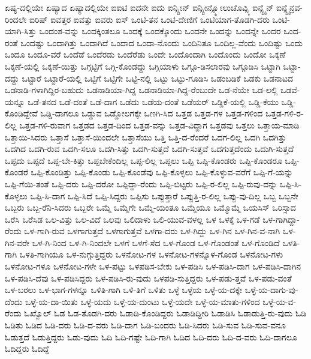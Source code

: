 {ಏಷ್ಯ-ದಲ್ಲಿಯೇ
ಏಷ್ಯಾದ
ಏಷ್ಯಾದಲ್ಲಿಯೇ
ಐಐಟಿ
ಐದನೇ
ಐದು
ಐನ್ಸ್ಟೀನ್
ಐನ್ಸ್ಟೀನ್ಸ್ಮೋಲುಚೊವ್ಸ್ಕಿ
ಐನ್ಸ್ಟೈನ್
ಐನ್ಸ್ಟೈನ್ರವ-ರಿಂದಲೇ
ಐರಿಷ್
ಐವತ್ತರ
ಐವತ್ತು
ಐವರು
ಐಸ್
ಒಂಟಿ-ತನ
ಒಂಟಿ-ದೇಣಿಗೆ
ಒಂಟಿಯಾಗ-ತೊಡಗಿ-ದರು
ಒಂಟಿ-ಯಾಗಿ-ಸಿತ್ತು
ಒಂದಂಶ-ವನ್ನು
ಒಂದಕ್ಕಿಂತಲೂ
ಒಂದಕ್ಕೆ
ಒಂದಕ್ಕೊಂದು
ಒಂದನೇ
ಒಂದನ್ನು
ಒಂದನ್ನೇ
ಒಂದರ
ಒಂದ-ರಂತೆ
ಒಂದಷ್ಟು
ಒಂದಾಗಿತ್ತು
ಒಂದಾಗಿದೆ
ಒಂದಾದ
ಒಂದಾ-ನೊಂದು
ಒಂದಿನಿತೂ
ಒಂದಿಲ್ಲ-ವೆಂದು
ಒಂದಿಷ್ಟು
ಒಂದು
ಒಂದೂ
ಒಂದೂ-ವರೆ
ಒಂದೆಡೆ
ಒಂದೆರಡು
ಒಂದೆರೆಡು
ಒಂದೇ
ಒಂದೊಂದಾಗಿ
ಒಂದೊಂದು
ಒಂದೋ
ಒಕ್ಕಣೆ
ಒಕ್ಕಣೆ-ಯಲ್ಲಿ
ಒಕ್ಕಣೆ-ಯಿತ್ತು
ಒಗ್ಗಟ್ಟಿಗೆ
ಒಗ್ಗಿ-ಕೊಂಡದ್ದು
ಒಗ್ಗಿಯಾಳು
ಒಗ್ಗೂ-ಡಿಸಲಾರವು
ಒಗ್ಗೂಡಿಸಿ
ಒಟ್ಟಾಗಿ
ಒಟ್ಟಾ-ದದ್ದು
ಒಟ್ಟಾರೆ
ಒಟ್ಟಾರೆ-ಯಲ್ಲಿ
ಒಟ್ಟಿಗೆ
ಒಟ್ಟಿಗೇ
ಒಟ್ಟಿ-ನಲ್ಲಿ
ಒಟ್ಟು
ಒಟ್ಟು-ಗೂಡಿಸಿ
ಒಡಂಬಡಿಕೆ
ಒಡಕು
ಒಡನಾಟದ
ಒಡನಾಡಿ-ಗಳಾಗಿದ್ದಿರ-ಬಹುದು
ಒಡನಾಡಿಯಾ-ಗಿದ್ದ
ಒಡನಾಡಿಯಾ-ಗಿದ್ದ-ರೆಂಬುದೇ
ಒಡ-ನೆಯೇ
ಒಡ-ಲಲ್ಲಿ
ಒಡವೆ-ಯನ್ನೂ
ಒಡೆ-ತನದ
ಒಡೆ-ದಂತೆ
ಒಡೆ-ದಾಗ
ಒಡೆದು
ಒಡೆಯ-ದಂತೆ
ಒಡೆಯರ್
ಒಡ್ಡಿಕೆ-ಯಲ್ಲಿ
ಒಡ್ಡಿ-ಕೆಯು
ಒಡ್ಡಿ-ಕೊಂಡಿದ್ದೇವೆ
ಒಡ್ಡಿ-ದಾಗಲೂ
ಒಡ್ಡುವ
ಒಡ್ಡೋಲಗಕ್ಕೇ
ಒಣಗಿ-ಸಿದ
ಒತ್ತಡ
ಒತ್ತಡ-ಗಳ
ಒತ್ತಡ-ಗಳಿಂದ
ಒತ್ತಡ-ಗಳಿ-ರ-ಲಿಲ್ಲ
ಒತ್ತಡ-ಗಳಿ-ರುವಾಗ
ಒತ್ತಡದ
ಒತ್ತಡ-ದಿಂದ
ಒತ್ತಡ-ವನ್ನು
ಒತ್ತಡ-ವಿದ್ದಾಗ
ಒತ್ತಡವು
ಒತ್ತಲು
ಒತ್ತಾಯ-ಮಾಡಿ
ಒತ್ತಾಯಿ-ಸಿದರು
ಒತ್ತಾಸೆ
ಒತ್ತಾಸೆ-ಯಿಂದಲೇ
ಒತ್ತಾಸೆಯು
ಒತ್ತಿ
ಒತ್ತಿ-ದ-ರೆಂದರೆ
ಒದಗ-ಲಿಲ್ಲ
ಒದಗಿ
ಒದಗಿತ್ತು
ಒದಗಿದ
ಒದಗಿ-ರುವ
ಒದಗಿ-ಸಲೂ
ಒದಗಿ-ಸಿತ್ತು
ಒದಗಿ-ಸುತ್ತದೆ
ಒದಗಿ-ಸುತ್ತವೆ
ಒದಗುತ್ತದೆಂದು
ಒದುಗಿ-ಸುತ್ತದೆ
ಒಪ್ಪದು
ಒಪ್ಪದೆ
ಒಪ್ಪ-ಬೇ-ಕಿತ್ತು
ಒಪ್ಪಬೇಕೆಂದಿಲ್ಲ
ಒಪ್ಪ-ಲಿಲ್ಲ
ಒಪ್ಪಲು
ಒಪ್ಪಿ
ಒಪ್ಪಿ-ಕೊಂಡರು
ಒಪ್ಪಿ-ಕೊಂಡರೂ
ಒಪ್ಪಿ-ಕೊಂಡರೆ
ಒಪ್ಪಿ-ಕೊಂಡಿತ್ತು
ಒಪ್ಪಿ-ಕೊಂಡು
ಒಪ್ಪಿ-ಕೊಂಡೆವು
ಒಪ್ಪಿ-ಕೊಳ್ಳಲು
ಒಪ್ಪಿ-ಕೊಳ್ಳುವ-ವರೆಗೆ
ಒಪ್ಪಿ-ಗೆ-ಯನ್ನು
ಒಪ್ಪಿ-ಗೆಯಿ-ತಂತೆ
ಒಪ್ಪಿ-ದರು
ಒಪ್ಪಿ-ದರೋ
ಒಪ್ಪಿದ್ದಾ-ರೆಂದು
ಒಪ್ಪಿ-ಬಿಟ್ಟರು
ಒಪ್ಪಿ-ರ-ಲಿಲ್ಲ
ಒಪ್ಪಿ-ರುವು-ದನ್ನು
ಒಪ್ಪಿ-ಸಿ-ಕೊಳ್ಳಲು
ಒಪ್ಪಿ-ಸಿ-ದಾಗ
ಒಪ್ಪಿ-ಸಿದೆ
ಒಪ್ಪಿ-ಸಿದ್ದರು
ಒಪ್ಪಿಸು
ಒಪ್ಪುತ್ತಾರೆ
ಒಪ್ಪುತ್ತಿ-ರ-ಲಿಲ್ಲ
ಒಪ್ಪು-ವು-ದಿಲ್ಲ
ಒಬ್ಬ
ಒಬ್ಬನೇ
ಒಬ್ಬರು
ಒಬ್ಬ-ರೆನಿ-ಸಿದರು
ಒಬ್ಬರೇ
ಒಮ್ಮೆ
ಒಮ್ಮೆಗೇ
ಒಮ್ಮೆ-ಯಂತೂ
ಒಮ್ಮೆಯೂ
ಒಮ್ಮೊಮ್ಮೆ
ಒಯಸಿಸ್
ಒರಿಸ್ಸಾದ
ಒರೆಸಿ
ಒರೆಸಿಡ
ಒಲ-ವಿತ್ತು
ಒಲ-ವಿದೆ
ಒಲವು
ಒಲಿದಾಳು
ಒಲಿ-ಯುವ-ವಳಲ್ಲ
ಒಳ
ಒಳಕ್ಕೆ
ಒಳ-ಗಡೆ
ಒಳ-ಗಾಗಿದ್ದಾ-ರೆಂದು
ಒಳ-ಗಾಗಿ-ರುವ
ಒಳಗಾಗುತ್ತದೆ
ಒಳಗಾಗುತ್ತವೆ
ಒಳಗಾ-ದರು
ಒಳ-ಗಿದ್ದು
ಒಳ-ಗಿನ
ಒಳ-ಗಿನ-ವ-ನಾಗಿ
ಒಳ-ಗಿನ-ವರೇ
ಒಳ-ಗಿ-ನಿಂದ
ಒಳ-ಗಿ-ನಿಂದಲೇ
ಒಳಗೆ
ಒಳಗೆ-ಸೆದ
ಒಳ-ಗೊಂಡ
ಒಳ-ಗೊಂಡಂತೆ
ಒಳ-ಗೊಂಡಿದೆ
ಒಳತಿ-ಗಾಗಿ
ಒಳತಿ-ಗಾಗಿಯೂ
ಒಳ-ನುಗ್ಗುತ್ತಿದ್ದರು
ಒಳನೋಟ-ಗಳ
ಒಳನೋಟ-ಗಳನ್ನೊಳ-ಗೊಂಡ
ಒಳನೋಟ-ಗಳು
ಒಳನೋಟ-ಗಳೂ
ಒಳನೋಟ-ಗಳೇ
ಒಳ-ಪಟ್ಟು
ಒಳಪಡಿಸ-ಬೇಕು
ಒಳ-ಪಡಿಸಿ
ಒಳ-ಪಡಿಸಿ-ದಾಗ
ಒಳ-ಪಡಿಸಿ-ದಾಗಿನ
ಒಳ-ಪಡಿಸಿ-ದೆವು
ಒಳ-ಪಡಿಸಿದ್ದರು
ಒಳ-ಪಡಿಸಿ-ರು-ವುದು
ಒಳಪಡಿ-ಸುತ್ತಿದ್ದರು
ಒಳ-ಪಡು-ತ್ತವೆ
ಒಳ-ಪಡು-ವಂತೆ
ಒಳ-ಬರಲು
ಒಳ-ಭಾಗ-ಗಳನ್ನೂ
ಒಳಿತಿ-ಗಾಗಿ
ಒಳಿ-ತಿಗೆ
ಒಳಿತು
ಒಳ್ಳೆ
ಒಳ್ಳೆಯ
ಒಳ್ಳೆ-ಯ-ದಕ್ಕೇ
ಒಳ್ಳೆ-ಯ-ದಾಗು-ವು-ದೆಂದು
ಒಳ್ಳೆ-ಯ-ದಾ-ಯಿತು
ಒಳ್ಳೆ-ಯದು
ಒಳ್ಳೆ-ಯ-ದುಂಟು
ಒಳ್ಳೆ-ಯದೇ
ಒಳ್ಳೆ-ಯ-ಮಾತು-ಗಳಿಂದ
ಒಳ್ಳೆ-ಯ-ವ-ರೆಂದು
ಓಖ್ವೊಲ್
ಓಡ
ಓಡ-ತೊಡಗಿ-ದರು
ಓಡಾಡಿ-ಕೊಂಡಿದ್ದರು
ಓಡಾಡಿದ್ದೀರಿ
ಓಡಾಡಿಸಿ
ಓಡಾಡುತ್ತಿ-ರು-ವುದು
ಓಡಿ
ಓಡಿತು
ಓಡಿದ
ಓಡಿ-ದರು
ಓಡಿ-ದ-ವರು
ಓಡಿ-ದಾಗ
ಓಡಿ-ಬಂದರು
ಓಡಿ-ಸಿದರು
ಓಡಿ-ಸುವ
ಓಡಿ-ಸುವ-ವನೂ
ಓಡುತ್ತದೆ
ಓಡುತ್ತಿದ್ದರು
ಓಡು-ವುದು
ಓದಿ
ಓದಿ-ಗಷ್ಟೇ
ಓದಿ-ಗಾಗಿ
ಓದಿದ
ಓದಿ-ದರು
ಓದಿ-ದ-ವರು
ಓದಿ-ದಾಗಲೂ
ಓದಿದ್ದರು
ಓದಿದ್ದೆ
}
